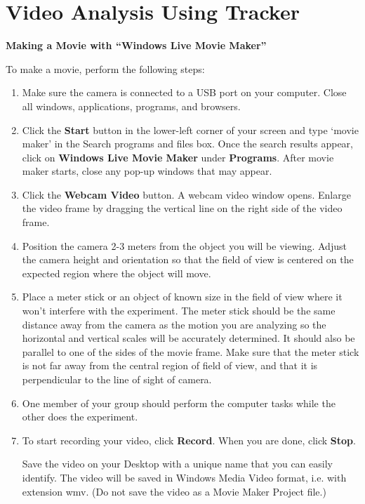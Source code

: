 
\section{Video Analysis Using Tracker}

\textbf{Making a Movie with ``Windows Live Movie Maker''} 

To make a movie, perform the following steps:

\begin{enumerate}

\item Make sure the camera is connected to a USB port on your computer. 
Close all windows, applications, programs, and browsers.

\item Click the {\bf Start} button in the lower-left corner of your screen and type `movie maker' 
in the Search programs and files box. 
Once the search results appear, click on {\bf Windows Live Movie Maker} under {\bf Programs}. 
After movie maker starts, close any pop-up windows that may appear.

\item Click the {\bf Webcam Video} button. 
A webcam video window opens. 
Enlarge the video frame by dragging the vertical line on the right side of the video frame.

\item Position the camera 2-3 meters from the object you will be viewing. 
Adjust the camera height and orientation so that the field of view is 
centered on the expected region where the object will move. 

\item Place a meter stick or an object of known size in the field of view where 
it won't interfere with the experiment. 
The meter stick should be the same distance away from the camera as the motion 
you are analyzing so the horizontal and vertical scales will be accurately determined. 
It should also be parallel to one of the sides of the movie frame. 
Make sure that the meter stick is not far away from the central region of field of view, and 
that it is perpendicular to the line of sight of camera.

\item One member of your group should perform the computer tasks while the other does the experiment.

\item To start recording your video, click {\bf Record}. When you are done, click {\bf Stop}. 

Save the video on your Desktop with a unique name that you can easily identify.
 The video will be saved in Windows Media Video format, i.e. with extension wmv. 
(Do not save the video as a Movie Maker Project file.)

\end{enumerate}

